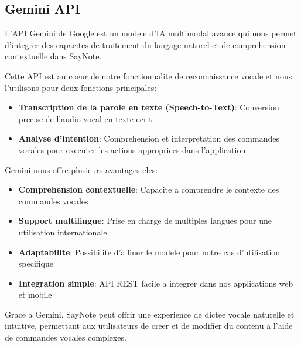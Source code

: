 \subsection{Gemini API}
\begin{minipage}{0.7\textwidth}
L'API Gemini de Google est un modele d'IA multimodal avance qui nous permet d'integrer des capacites de traitement du langage naturel et de comprehension contextuelle dans SayNote. 

Cette API est au coeur de notre fonctionnalite de reconnaissance vocale et nous l'utilisons pour deux fonctions principales:
\begin{itemize}
    \item \textbf{Transcription de la parole en texte (Speech-to-Text)}: Conversion precise de l'audio vocal en texte ecrit
    \item \textbf{Analyse d'intention}: Comprehension et interpretation des commandes vocales pour executer les actions appropriees dans l'application
\end{itemize}

Gemini nous offre plusieurs avantages cles:
\begin{itemize}
    \item \textbf{Comprehension contextuelle}: Capacite a comprendre le contexte des commandes vocales
    \item \textbf{Support multilingue}: Prise en charge de multiples langues pour une utilisation internationale
    \item \textbf{Adaptabilite}: Possibilite d'affiner le modele pour notre cas d'utilisation specifique
    \item \textbf{Integration simple}: API REST facile a integrer dans nos applications web et mobile
\end{itemize}

Grace a Gemini, SayNote peut offrir une experience de dictee vocale naturelle et intuitive, permettant aux utilisateurs de creer et de modifier du contenu a l'aide de commandes vocales complexes.
\end{minipage}%
\hfill
